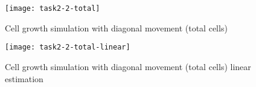 \clearpage

\begin{figure}[ht]
    \centering
    \texttt{[image: task2-2-total]}
    \caption[Cell growth simulation with diagonal movement (total cells)]{Cell growth simulation with diagonal movement (total cells)}
    \label{fig:task2-2-total}
\end{figure}

\begin{figure}[ht]
    \centering
    \texttt{[image: task2-2-total-linear]}
    \caption[Cell growth simulation with diagonal movement (total cells) linear estimation]{Cell growth simulation with diagonal movement (total cells) linear estimation}
    \label{fig:task2-2-total-linear}
\end{figure}